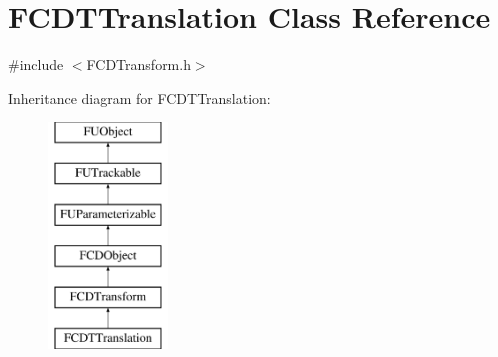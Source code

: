 \hypertarget{classFCDTTranslation}{
\section{FCDTTranslation Class Reference}
\label{classFCDTTranslation}
}


{\ttfamily \#include $<$FCDTransform.h$>$}

Inheritance diagram for FCDTTranslation:\begin{figure}[H]
\begin{center}
\leavevmode
\includegraphics[height=6.000000cm]{classFCDTTranslation}
\end{center}
\end{figure}
